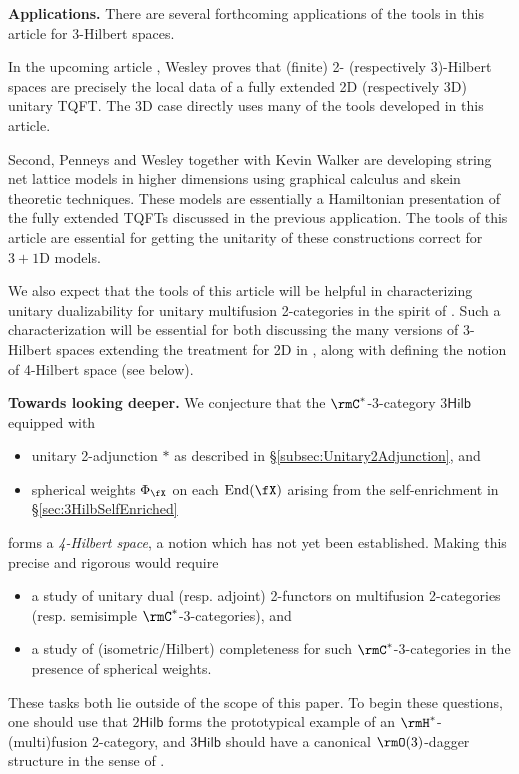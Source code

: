 \documentclass[12pt, reqno]{amsart}
\DeclareMathOperator{\End}{End}
\newcommand{\Hilb}{\mathsf{Hilb}}
\theoremstyle{plain}
\theoremstyle{definition}
\begin{document}
\medskip
\noindent
{\textbf{Applications.}}
There are several forthcoming applications of the tools in this article for 3-Hilbert spaces.

In the upcoming article \cite{UnitaryDiskLike}, Wesley proves that (finite) 2- (respectively 3)-Hilbert spaces are precisely the local data of a fully extended 2D (respectively 3D) unitary TQFT. 
The 3D case directly uses many of the tools developed in this article.

Second, Penneys and Wesley together with Kevin Walker
are developing string net lattice models in higher dimensions using graphical calculus and skein theoretic techniques.
These models are essentially a Hamiltonian presentation of the fully extended TQFTs discussed in the previous application.
The tools of this article are essential for getting the unitarity of these constructions correct for $3+1$D models.

We also expect that the tools of this article will be helpful in characterizing unitary dualizability for unitary multifusion 2-categories in the spirit of \cite{MR4133163}.
Such a characterization will be essential for both discussing the many versions of 3-Hilbert spaces extending the treatment for 2D in \cite{2606.11334}, along with defining the notion of 4-Hilbert space (see below).

\medskip
\noindent
{\textbf{Towards looking deeper.}}
We conjecture that the $\rmC^*$-3-category $3\Hilb$ equipped with 
\begin{itemize}
\item unitary 2-adjunction $*$ as described in \S\ref{subsec:Unitary2Adjunction}, and
\item spherical weights $\Phi_\fX$ on each $\End(\fX)$ arising from the self-enrichment in \S \ref{sec:3HilbSelfEnriched}
\end{itemize}
forms a \emph{4-Hilbert space}, a notion which has not yet been established. 
Making this precise and rigorous would require
\begin{itemize}
\item a study of unitary dual (resp. adjoint) 2-functors on multifusion 2-categories (resp. semisimple $\rmC^*$-3-categories), and
\item 
a study of (isometric/Hilbert) completeness for such $\rmC^*$-3-categories in the presence of spherical weights. 
\end{itemize}
These tasks both lie outside of the scope of this paper. 
To begin these questions, one should use that $2\Hilb$ forms the prototypical example of an $\rmH^*$-(multi)fusion 2-category, and $3\Hilb$ should have a canonical $\rmO(3)$-dagger structure in the sense of \cite{2403.01651,2606.11334}.
\end{document}
